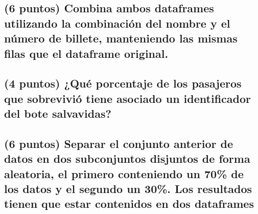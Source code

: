 \documentclass[]{article}
\begin{document}
\subsection{(6 puntos) Combina ambos dataframes utilizando la
combinación del nombre y el número de billete, manteniendo las mismas
filas que el dataframe
original.}\label{puntos-combina-ambos-dataframes-utilizando-la-combinacion-del-nombre-y-el-numero-de-billete-manteniendo-las-mismas-filas-que-el-dataframe-original.}

\subsection{(4 puntos) ¿Qué porcentaje de los pasajeros que sobrevivió
tiene asociado un identificador del bote
salvavidas?}\label{puntos-que-porcentaje-de-los-pasajeros-que-sobrevivio-tiene-asociado-un-identificador-del-bote-salvavidas}

\subsection{(6 puntos) Separar el conjunto anterior de datos en dos
subconjuntos disjuntos de forma aleatoria, el primero conteniendo un
70\% de los datos y el segundo un 30\%. Los resultados tienen que estar
contenidos en dos
dataframes}\label{puntos-separar-el-conjunto-anterior-de-datos-en-dos-subconjuntos-disjuntos-de-forma-aleatoria-el-primero-conteniendo-un-70-de-los-datos-y-el-segundo-un-30.-los-resultados-tienen-que-estar-contenidos-en-dos-dataframes}
\end{document}
